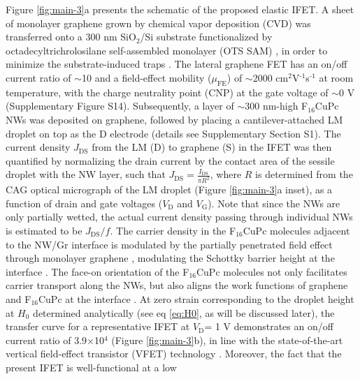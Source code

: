 \documentclass[journal=nalefd,manuscript=letter,email=true,hyperref=true,keywords=true]{achemso}
\begin{document}
Figure \ref{fig:main-3}a presents the schematic of the proposed elastic
IFET. A sheet of monolayer graphene grown by chemical vapor
deposition (CVD) was transferred onto a 300 nm SiO\(_{\text{2}}\)/Si substrate
functionalized by octadecyltrichrolosilane self-assembled monolayer
(OTS SAM) \cite{Yan_2011}, in order to minimize the substrate-induced
traps \cite{Wang_2011}.  The lateral graphene FET has an on/off current
ratio of \(\sim\)10 and a field-effect mobility (\(\mu_{\mathrm{FE}}\))
of \(\sim\)2000 cm\(^{\text{2}}\)V\(^{\text{-1}}\)s\(^{\text{-1}}\) at room temperature, with the charge
neutrality point (CNP) at the gate voltage of \(\sim\)0 V (Supplementary
Figure  S14). Subsequently, a layer of \(\sim\)300 nm-high F\(_{\text{16}}\)CuPc NWs
was deposited on graphene, followed by placing a cantilever-attached
LM droplet on top as the D electrode (details see Supplementary
Section S1).  The current density \(J_{\mathrm{DS}}\) from the LM (D)
to graphene (S) in the IFET was then quantified by normalizing the
drain current by the contact area of the sessile droplet with the NW
layer, such that \(J_{\mathrm{DS}} = {\displaystyle
 \frac{I_{\mathrm{DS}}}{\pi R^{2}}}\), where \(R\) is determined from the
CAG optical micrograph of the LM droplet (Figure \ref{fig:main-3}a inset), as a function of drain and
gate voltages (\(V_{\mathrm{D}}\) and \(V_{\mathrm{G}}\)). Note that
since the NWs are only partially wetted, the actual current density
passing through individual NWs is estimated to be
\(J_{\mathrm{DS}}/f\). The carrier density in the F\(_{\text{16}}\)CuPc molecules
adjacent to the NW/Gr interface is modulated by the partially
penetrated field effect through monolayer graphene
\cite{Tian_2016,Shih2015Partially}, modulating the Schottky barrier
height at the interface \cite{Yang2012Barristor}. The face-on
orientation of the F\(_{\text{16}}\)CuPc molecules not only facilitates carrier
transport along the NWs, but also aligns the work functions of
graphene and F\(_{\text{16}}\)CuPc at the interface
\cite{Mao_2010_F16_level_orien,Ren_2011_F16Gr_Elevel}. At zero strain
corresponding to the droplet height at \(H_{0}\) determined
analytically (see eq \ref{eq:H0}, as will be discussed later), the transfer
curve for a representative IFET at \(V_{\mathrm{D}}\)= 1 V
demonstrates an on/off current ratio of 3.9\(\times\)10\(^{\text{4}}\) (Figure
\ref{fig:main-3}b), in line with the state-of-the-art vertical
field-effect transistor (VFET) technology
\cite{Yang2012Barristor,Shih2015Partially,Sun_2017_COF_VFET,Ben_Sasson_2011}. Moreover,
the fact that the present IFET is well-functional at a low
\end{document}
